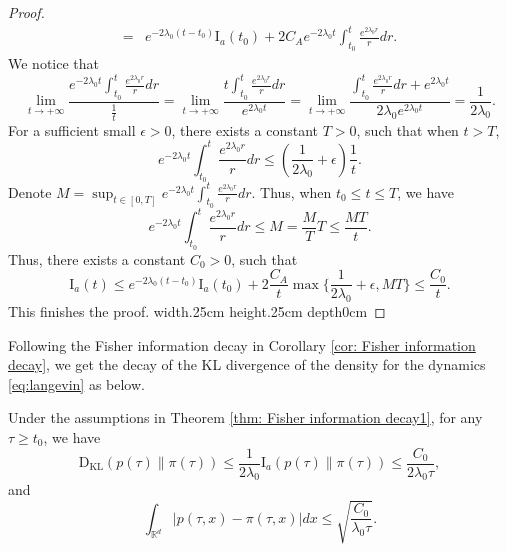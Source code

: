 \documentclass[11pt,reqno]{amsart}
\def\qed{ \hfill \vrule width.25cm height.25cm depth0cm\smallskip}
\begin{document}
\begin{proof}
\begin{equation*}
\begin{split}
=&e^{-2\lambda_0(t-t_0)}\mathrm I_a(t_0)+2C_Ae^{-2\lambda_0 t}\int_{t_0}^t \frac{e^{2\lambda_0 r}}{r} dr. 
 \end{split}   
\end{equation*}
We notice that 
\begin{equation*}
   \lim_{t\rightarrow +\infty}\frac{e^{-2\lambda_0 t}\int_{t_0}^t \frac{e^{2\lambda_0 r}}{r} dr}{\frac{1}{t}}=    \lim_{t\rightarrow +\infty}\frac{t\int_{t_0}^t \frac{e^{2\lambda_0 r}}{r} dr}{e^{2\lambda_0 t}}=\lim_{t\rightarrow +\infty}\frac{\int_{t_0}^t \frac{e^{2\lambda_0 r}}{r} dr+e^{2\lambda_0 t}}{2\lambda_0 e^{2\lambda_0 t}}=\frac{1}{2\lambda_0}. 
\end{equation*}
For a sufficient small $\epsilon>0$, there exists a constant $T>0$, such that when $t>T$, 
\begin{equation*}
    e^{-2\lambda_0 t}\int_{t_0}^t \frac{e^{2\lambda_0 r}}{r} dr\leq (\frac{1}{2\lambda_0}+\epsilon)\frac{1}{t}. 
\end{equation*}
Denote $M=
\sup_{t\in [0, T]} e^{-2\lambda_0 t}\int_{t_0}^t \frac{e^{2\lambda_0 r}}{r} dr$. 
Thus, when $t_0\leq t\leq T$, we have 
\begin{equation*}
     e^{-2\lambda_0 t}\int_{t_0}^t \frac{e^{2\lambda_0 r}}{r} dr\leq M=\frac{M}{T}T\leq \frac{MT}{t}. 
\end{equation*}
Thus, there exists a constant $C_0>0$, such that 
\begin{equation*}
  \mathrm I_a(t)\leq e^{-2\lambda_0(t-t_0)}\mathrm I_a(t_0)+2\frac{C_A}{t} \max\{\frac{1}{2\lambda_0}+\epsilon, MT\} \leq \frac{C_0}{t}.  
\end{equation*}
This finishes the proof. 
\qed 
\end{proof}
Following the Fisher information decay in Corollary \ref{cor: Fisher information decay}, we get the decay of the KL divergence of the density for the dynamics \eqref{eq:langevin} as below.
\begin{corollary} \label{corolllary:KL_convergence_rate}
Under the assumptions in Theorem \ref{thm: Fisher information decay1}, for any $\tau\ge t_0$, we have 
    \begin{equation*}
    \mathrm{D}_{\mathrm{KL}}({p} (\tau)\|\pi(\tau))\le \frac{1}{2\lambda_{0}} \mathrm{I}_a({p} (\tau)\|\pi(\tau))\leq \frac{C_0}{2\lambda_0 \tau}, 
\end{equation*}
and 
\begin{equation*}
    \int_{\mathbb R^d} |{p} (\tau,x)-\pi(\tau,x)|dx\leq \sqrt{\frac{C_0}{\lambda_0\tau}}.
\end{equation*}

\end{corollary}
\end{document}

